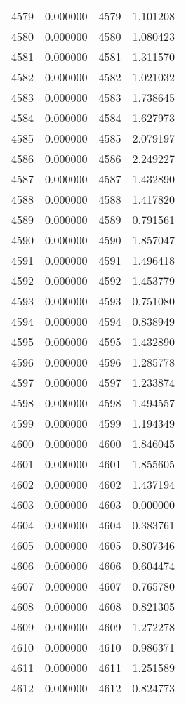 \documentclass[12pt]{article}
\begin{document}
\begin{longtable}{@{}cccc@{}}
4579 & 0.000000 & 4579 & 1.101208 \\
4580 & 0.000000 & 4580 & 1.080423 \\
4581 & 0.000000 & 4581 & 1.311570 \\
4582 & 0.000000 & 4582 & 1.021032 \\
4583 & 0.000000 & 4583 & 1.738645 \\
4584 & 0.000000 & 4584 & 1.627973 \\
4585 & 0.000000 & 4585 & 2.079197 \\
4586 & 0.000000 & 4586 & 2.249227 \\
4587 & 0.000000 & 4587 & 1.432890 \\
4588 & 0.000000 & 4588 & 1.417820 \\
4589 & 0.000000 & 4589 & 0.791561 \\
4590 & 0.000000 & 4590 & 1.857047 \\
4591 & 0.000000 & 4591 & 1.496418 \\
4592 & 0.000000 & 4592 & 1.453779 \\
4593 & 0.000000 & 4593 & 0.751080 \\
4594 & 0.000000 & 4594 & 0.838949 \\
4595 & 0.000000 & 4595 & 1.432890 \\
4596 & 0.000000 & 4596 & 1.285778 \\
4597 & 0.000000 & 4597 & 1.233874 \\
4598 & 0.000000 & 4598 & 1.494557 \\
4599 & 0.000000 & 4599 & 1.194349 \\
4600 & 0.000000 & 4600 & 1.846045 \\
4601 & 0.000000 & 4601 & 1.855605 \\
4602 & 0.000000 & 4602 & 1.437194 \\
4603 & 0.000000 & 4603 & 0.000000 \\
4604 & 0.000000 & 4604 & 0.383761 \\
4605 & 0.000000 & 4605 & 0.807346 \\
4606 & 0.000000 & 4606 & 0.604474 \\
4607 & 0.000000 & 4607 & 0.765780 \\
4608 & 0.000000 & 4608 & 0.821305 \\
4609 & 0.000000 & 4609 & 1.272278 \\
4610 & 0.000000 & 4610 & 0.986371 \\
4611 & 0.000000 & 4611 & 1.251589 \\
4612 & 0.000000 & 4612 & 0.824773 \\

\end{longtable}
\end{document}
